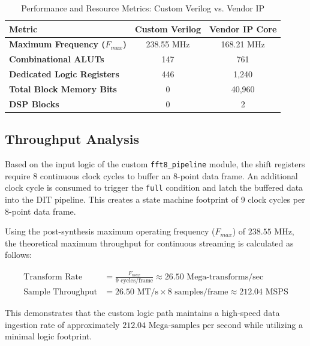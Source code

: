 \documentclass[11pt]{article}
\begin{document}
\begin{table}[H]
    \centering
    \caption{Performance and Resource Metrics: Custom Verilog vs. Vendor IP}
    \label{tab:comparison}
    \begin{tabular}{@{}lcc@{}}
        \toprule
        \textbf{Metric} & \textbf{Custom Verilog} & \textbf{Vendor IP Core} \\ 
        \midrule
        \textbf{Maximum Frequency ($F_{max}$)} & 238.55 MHz & 168.21 MHz \\
        \textbf{Combinational ALUTs}           & 147        & 761        \\
        \textbf{Dedicated Logic Registers}     & 446        & 1,240      \\
        \textbf{Total Block Memory Bits}       & 0          & 40,960     \\
        \textbf{DSP Blocks}                    & 0          & 2          \\ 
        \bottomrule
    \end{tabular}
\end{table}

\subsection{Throughput Analysis}
Based on the input logic of the custom \texttt{fft8\_pipeline} module, the shift registers require 8 continuous clock cycles to buffer an 8-point data frame. An additional clock cycle is consumed to trigger the \texttt{full} condition and latch the buffered data into the DIT pipeline. This creates a state machine footprint of 9 clock cycles per 8-point data frame.

Using the post-synthesis maximum operating frequency ($F_{max}$) of $238.55\text{ MHz}$, the theoretical maximum throughput for continuous streaming is calculated as follows:

\begin{align*}
    \text{Transform Rate} &= \frac{F_{max}}{9 \text{ cycles/frame}} \approx 26.50 \text{ Mega-transforms/sec} \\
    \text{Sample Throughput} &= 26.50 \text{ MT/s} \times 8 \text{ samples/frame} \approx 212.04 \text{ MSPS}
\end{align*}

This demonstrates that the custom logic path maintains a high-speed data ingestion rate of approximately $212.04\text{ Mega-samples per second}$ while utilizing a minimal logic footprint.
\end{document}
